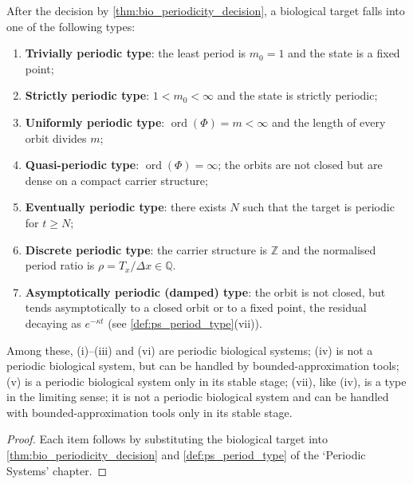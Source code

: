\begin{corollary}\label{cor:bio_period_type}
After the decision by \cref{thm:bio_periodicity_decision}, a biological target falls into one of the following types:
\begin{enumerate}[label=(\roman*)]
    \item \textbf{Trivially periodic type}: the least period is $m_0=1$ and the state is a fixed point;
    \item \textbf{Strictly periodic type}: $1<m_0<\infty$ and the state is strictly periodic;
    \item \textbf{Uniformly periodic type}: $\operatorname{ord}(\Phi)=m<\infty$ and the length of every orbit divides $m$;
    \item \textbf{Quasi-periodic type}: $\operatorname{ord}(\Phi)=\infty$; the orbits are not closed but are dense on a compact carrier structure;
    \item \textbf{Eventually periodic type}: there exists $N$ such that the target is periodic for $t\ge N$;
    \item \textbf{Discrete periodic type}: the carrier structure is $\mathbb Z$ and the normalised period ratio is $\rho=T_x/\Delta x\in\mathbb Q$.
    \item \textbf{Asymptotically periodic (damped) type}: the orbit is not closed, but tends asymptotically to a closed orbit or to a fixed point, the residual decaying as $e^{-\kappa t}$ (see \cref{def:ps_period_type}(vii)).
\end{enumerate}
Among these, (i)--(iii) and (vi) are periodic biological systems; (iv) is not a periodic biological system, but can be handled by bounded-approximation tools; (v) is a periodic biological system only in its stable stage; (vii), like (iv), is a type in the limiting sense; it is not a periodic biological system and can be handled with bounded-approximation tools only in its stable stage.
\end{corollary}

\begin{proof}
Each item follows by substituting the biological target into \cref{thm:bio_periodicity_decision} and \cref{def:ps_period_type} of the `Periodic Systems' chapter.
\end{proof}

